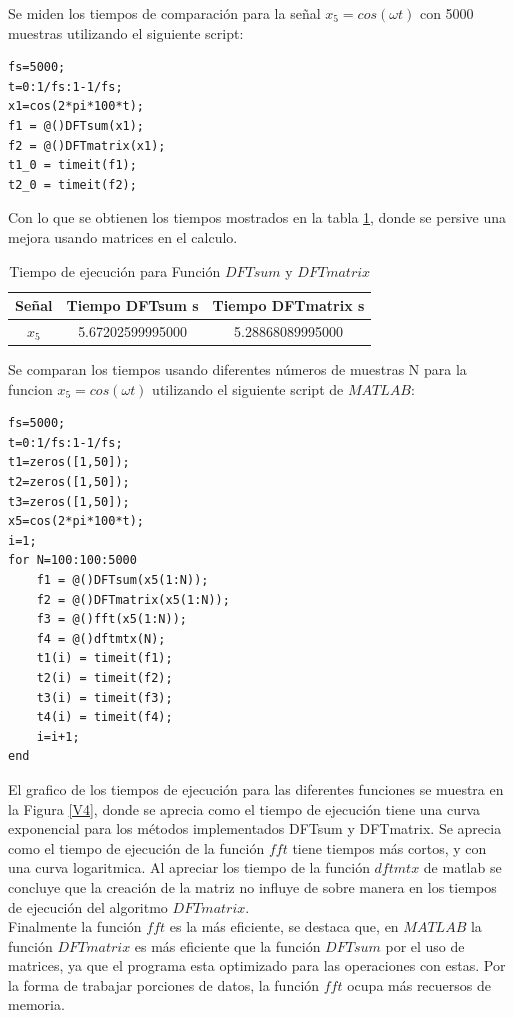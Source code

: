 \documentclass[letterpaper,onecolumn,10pt,journal,final]{IEEEtran}
\begin{document}
\begin{enumerate}[1)]
Se miden los tiempos de comparación para la señal $x_5 = cos(\omega t)$ con 5000 muestras utilizando el siguiente script:
\begin{lstlisting}
fs=5000;
t=0:1/fs:1-1/fs;
x1=cos(2*pi*100*t);
f1 = @()DFTsum(x1);
f2 = @()DFTmatrix(x1);
t1_0 = timeit(f1);
t2_0 = timeit(f2);
\end{lstlisting}
Con lo que se obtienen los tiempos mostrados en la tabla \ref{tab:4}, donde se persive una mejora usando matrices en el calculo.
\begin{table}[H]
        \centering
        \begin{tabular}{|c|c|c|}
        \hline
            Señal     & Tiempo DFTsum s& Tiempo DFTmatrix s \\ \hline
            $x_5$  &5.67202599995000 &5.28868089995000\\\hline
        \end{tabular}
        \caption{Tiempo de ejecución para Función $DFTsum$ y $DFTmatrix$}
        \label{tab:4}
\end{table}
Se comparan los tiempos usando diferentes números de muestras N para la funcion $x_5 = cos(\omega t)$ utilizando el siguiente script de $MATLAB$:
\begin{lstlisting}
fs=5000;
t=0:1/fs:1-1/fs;
t1=zeros([1,50]);
t2=zeros([1,50]);
t3=zeros([1,50]);
x5=cos(2*pi*100*t);
i=1;
for N=100:100:5000
    f1 = @()DFTsum(x5(1:N));
    f2 = @()DFTmatrix(x5(1:N));
    f3 = @()fft(x5(1:N));
    f4 = @()dftmtx(N);
    t1(i) = timeit(f1);
    t2(i) = timeit(f2);
    t3(i) = timeit(f3);
    t4(i) = timeit(f4);
    i=i+1;
end
\end{lstlisting}
El grafico de los tiempos de ejecución para las diferentes funciones se muestra en la Figura \ref{V4}, donde se aprecia como el tiempo de ejecución tiene una curva exponencial para los métodos implementados DFTsum y DFTmatrix. Se aprecia como el tiempo de ejecución de la función $fft$ tiene tiempos más cortos, y con una curva logaritmica. Al apreciar los tiempo de la función $dftmtx$ de matlab se concluye que la creación de la matriz no influye de sobre manera en los tiempos de ejecución del algoritmo $DFTmatrix$.\\
Finalmente la función $fft$ es la más eficiente, se destaca que, en $MATLAB$ la función $DFTmatrix$ es más eficiente que la función $DFTsum$ por el uso de matrices, ya que el programa esta optimizado para las operaciones con estas. Por la forma de trabajar porciones de datos, la función $fft$ ocupa más recuersos de memoria.
\begin{figure}[H]

\end{figure}
\end{enumerate}
\end{document}
